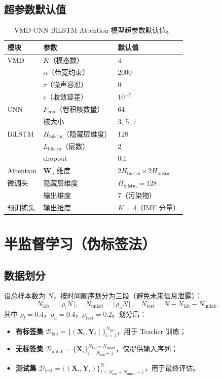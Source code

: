 \documentclass[11pt,a4paper]{article}
\newcommand{\mat}[1]{\bm{#1}}
\begin{document}
\subsection{超参数默认值}
\begin{table}[ht]
\centering
\begin{tabular}{@{}lll@{}}
\toprule
模块 & 参数 & 默认值 \\ \midrule
VMD & $K$（模态数） & 4 \\
    & $\alpha$（带宽约束） & 2000 \\
    & $\tau$（噪声容忍） & 0 \\
    & $\epsilon$（收敛容差） & $10^{-7}$ \\ \midrule
CNN & $F_{\text{cnn}}$（卷积核数量） & 64 \\
    & 核大小 & 3, 5, 7 \\ \midrule
BiLSTM & $H_{\text{bilstm}}$（隐藏层维度） & 128 \\
       & $L_{\text{bilstm}}$（层数） & 2 \\
       & dropout & 0.1 \\ \midrule
Attention & $\mat{W}_a$ 维度 & $2H_{\text{bilstm}} \times 2H_{\text{bilstm}}$ \\ \midrule
微调头 & 隐藏层维度 & $H_{\text{bilstm}} = 128$ \\
       & 输出维度 & 7（污染物） \\ \midrule
预训练头 & 输出维度 & $K = 4$（IMF 分量） \\
\bottomrule
\end{tabular}
\caption{VMD-CNN-BiLSTM-Attention 模型超参数默认值。}
\end{table}

\section{半监督学习（伪标签法）}

\subsection{数据划分}
设总样本数为 $N$，按时间顺序划分为三段（避免未来信息泄露）：
\[
N_{\text{lab}} = \lfloor \rho_l N \rfloor,\quad N_{\text{unlab}} = \lfloor \rho_u N \rfloor,\quad N_{\text{test}} = N - N_{\text{lab}} - N_{\text{unlab}},
\]
其中 $\rho_l = 0.4$，$\rho_u = 0.4$，$\rho_{\text{test}} = 0.2$。划分后：
\begin{itemize}[leftmargin=*]
  \item \textbf{有标签集} $\mathcal{D}_{\text{lab}} = \{(\mat{X}_i, \mat{Y}_i)\}_{i=1}^{N_{\text{lab}}}$，用于 Teacher 训练；
  \item \textbf{无标签集} $\mathcal{D}_{\text{unlab}} = \{\mat{X}_i\}_{i=N_{\text{lab}}+1}^{N_{\text{lab}}+N_{\text{unlab}}}$，仅提供输入序列；
  \item \textbf{测试集} $\mathcal{D}_{\text{test}} = \{(\mat{X}_i, \mat{Y}_i)\}_{i=N_{\text{lab}}+N_{\text{unlab}}+1}^{N}$，用于最终评估。
\end{itemize}
\end{document}
